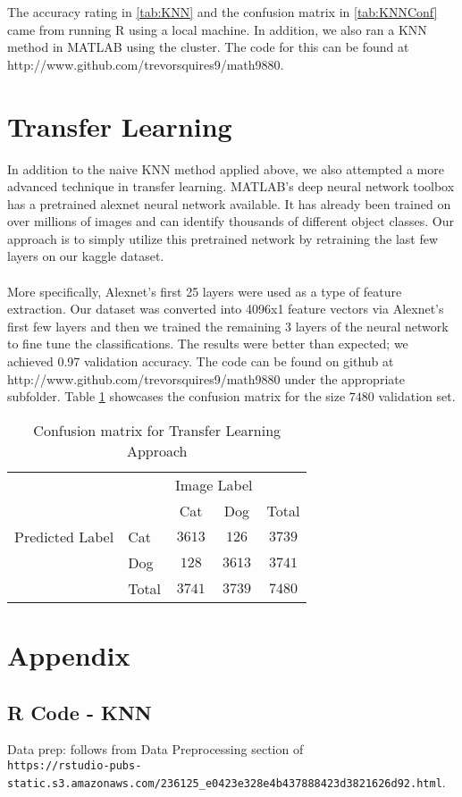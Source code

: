 \documentclass[12pt]{article}
\newcommand{\<}{\langle}
\renewcommand{\>}{\rangle}
\theoremstyle{definition}
\begin{document}
The accuracy rating in \ref{tab:KNN} and the confusion matrix in \ref{tab:KNNConf} came from running R using a local machine. In addition, we also ran a KNN method in MATLAB using the cluster. The code for this can be found at http://www.github.com/trevorsquires9/math9880.


\section*{Transfer Learning}
In addition to the naive KNN method applied above, we also attempted a more advanced technique in transfer learning.  MATLAB's deep neural network toolbox has a pretrained alexnet neural network available.  It has already been trained on over millions of images and can identify thousands of different object classes.  Our approach is to simply utilize this pretrained network by retraining the last few layers on our kaggle dataset.  \\\\
More specifically, Alexnet's first 25 layers were used as a type of feature extraction.  Our dataset was converted into 4096x1 feature vectors via Alexnet's first few layers and then we trained the remaining 3 layers of the neural network to fine tune the classifications. The results were better than expected; we achieved 0.97 validation accuracy.  The code can be found on github at http://www.github.com/trevorsquires9/math9880 under the appropriate subfolder. Table \ref{tab:TL} showcases the confusion matrix for the size $7480$ validation set. 
\begin{table}[ht]
\centering
\begin{tabular}{l|l|c|c|c}
\multicolumn{2}{c}{}&\multicolumn{2}{c}{Image Label}&\\
\cline{3-4}
\multicolumn{2}{c|}{}&Cat&Dog&\multicolumn{1}{c}{Total}\\
\cline{2-4}
{Predicted Label}& Cat & $3613$ & $126$ & $3739$\\
\cline{2-4}
& Dog & $128$ & $3613$ & $3741$\\
\cline{2-4}
\multicolumn{1}{c}{} & \multicolumn{1}{c}{Total} & \multicolumn{1}{c}{$3741$} & \multicolumn{    1}{c}{$3739$} & \multicolumn{1}{c}{$7480$}\\
\end{tabular}
\caption{Confusion matrix for Transfer Learning Approach}
\label{tab:TL}
\end{table}
\newpage
\section*{Appendix}
\subsection*{R Code - KNN}
Data prep: follows from Data Preprocessing section of \\
\small{
\verb|https://rstudio-pubs-static.s3.amazonaws.com/236125_e0423e328e4b437888423d3821626d92.html|.
}


\begin{verbatim}
\end{verbatim}
\end{document}
